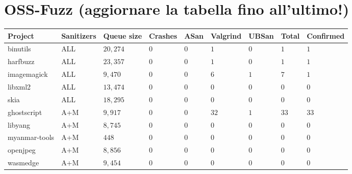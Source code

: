 \section{OSS-Fuzz (aggiornare la tabella fino all'ultimo!)}
\begin{adjustbox}{width=\textwidth,center}
\begin{tabular}{|l|l|l|l|l|l|l|l|l|}
\hline
\textbf{Project} & \textbf{Sanitizers} & \textbf{Queue size} & \textbf{Crashes} & \textbf{ASan} & \textbf{Valgrind} & \textbf{UBSan} & \textbf{Total} & \textbf{Confirmed}  \\ 
\hline
binutils         & ALL                 & $20,274$            & $0$              & $0$           & $1$           & $0$            & $1$             & $1$                 \\
harfbuzz         & ALL                 & $23,357$            & $0$              & $0$           & $1$           & $0$            & $1$             & $1$                 \\
imagemagick      & ALL                 & $9,470$             & $0$              & $0$           & $6$           & $1$            & $7$             & $1$                 \\
libxml2          & ALL                 & $13,474$            & $0$              & $0$           & $0$           & $0$            & $0$             & $0$                 \\
skia             & ALL                 & $18,295$            & $0$              & $0$           & $0$           & $0$            & $0$             & $0$                 \\ 
\hline
ghostscript      & A+M                 & $9,917$             & $0$              & $0$           & $32$          & $1$            & $33$            & $33$                \\
libyang          & A+M                 & $8,745$             & $0$              & $0$           & $0$           & $0$            & $0$             & $0$                 \\
myanmar-tools    & A+M                 & $448$               & $0$              & $0$           & $0$           & $0$            & $0$             & $0$                 \\
openjpeg         & A+M                 & $8,856$             & $0$              & $0$           & $0$           & $0$            & $0$             & $0$                 \\
wasmedge         & A+M                 & $9,454$             & $0$              & $0$           & $0$           & $0$            & $0$             & $0$                 \\ 

\end{tabular}
\end{adjustbox}
